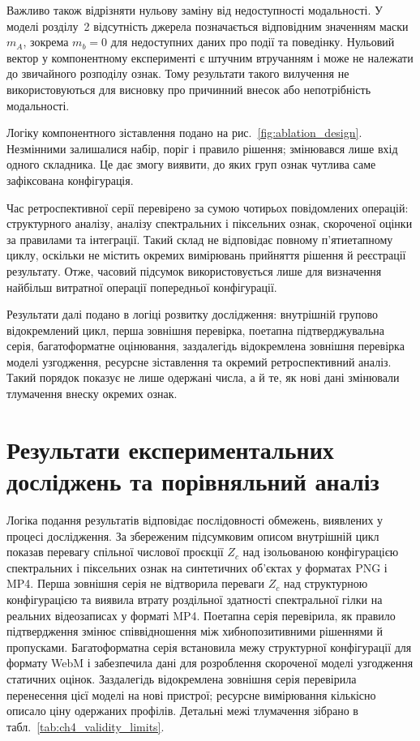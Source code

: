 Важливо також відрізняти нульову заміну від недоступності модальності. У моделі розділу~2 відсутність джерела позначається відповідним значенням маски $m_A$, зокрема $m_b=0$ для недоступних даних про події та поведінку. Нульовий вектор у компонентному експерименті є штучним втручанням і може не належати до звичайного розподілу ознак. Тому результати такого вилучення не використовуються для висновку про причинний внесок або непотрібність модальності.

Логіку компонентного зіставлення подано на рис.~\ref{fig:ablation_design}. Незмінними залишалися набір, поріг і правило рішення; змінювався лише вхід одного складника. Це дає змогу виявити, до яких груп ознак чутлива саме зафіксована конфігурація.



Час ретроспективної серії перевірено за сумою чотирьох повідомлених операцій: структурного аналізу, аналізу спектральних і піксельних ознак, скороченої оцінки за правилами та інтеграції. Такий склад не відповідає повному п’ятиетапному циклу, оскільки не містить окремих вимірювань прийняття рішення й реєстрації результату. Отже, часовий підсумок використовується лише для визначення найбільш витратної операції попередньої конфігурації.

Результати далі подано в логіці розвитку дослідження: внутрішній групово відокремлений цикл, перша зовнішня перевірка, поетапна підтверджувальна серія, багатоформатне оцінювання, заздалегідь відокремлена зовнішня перевірка моделі узгодження, ресурсне зіставлення та окремий ретроспективний аналіз. Такий порядок показує не лише одержані числа, а й те, як нові дані змінювали тлумачення внеску окремих ознак.

\section{Результати експериментальних досліджень та порівняльний аналіз}
\label{sec:ch4_ind_svs}

Логіка подання результатів відповідає послідовності обмежень, виявлених у процесі дослідження. За збереженим підсумковим описом внутрішній цикл показав перевагу спільної числової проєкції $Z_c$ над ізольованою конфігурацією спектральних і піксельних ознак на синтетичних об’єктах у форматах PNG і MP4. Перша зовнішня серія не відтворила переваги $Z_c$ над структурною конфігурацією та виявила втрату роздільної здатності спектральної гілки на реальних відеозаписах у форматі MP4. Поетапна серія перевірила, як правило підтвердження змінює співвідношення між хибнопозитивними рішеннями й пропусками. Багатоформатна серія встановила межу структурної конфігурації для формату WebM і забезпечила дані для розроблення скороченої моделі узгодження статичних оцінок. Заздалегідь відокремлена зовнішня серія перевірила перенесення цієї моделі на нові пристрої; ресурсне вимірювання кількісно описало ціну одержаних профілів. Детальні межі тлумачення зібрано в табл.~\ref{tab:ch4_validity_limits}.

